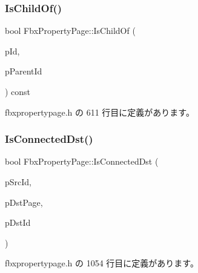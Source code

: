 \subsubsection{\texorpdfstring{Is\+Child\+Of()}{IsChildOf()}}
{\footnotesize\ttfamily bool Fbx\+Property\+Page\+::\+Is\+Child\+Of (\begin{DoxyParamCaption}\item[{\hyperlink{fbxtypes_8h_a088fa96de3b0b3ea69f0f6afef525dfb}{Fbx\+Int}}]{p\+Id,  }\item[{\hyperlink{fbxtypes_8h_a088fa96de3b0b3ea69f0f6afef525dfb}{Fbx\+Int}}]{p\+Parent\+Id }\end{DoxyParamCaption}) const\hspace{0.3cm}{\ttfamily [inline]}}



 fbxpropertypage.\+h の 611 行目に定義があります。

\mbox{\label{class_fbx_property_page_ac637ff1244d34adf55fe0cc16eab4085}} 
\subsubsection{\texorpdfstring{Is\+Connected\+Dst()}{IsConnectedDst()}}
{\footnotesize\ttfamily bool Fbx\+Property\+Page\+::\+Is\+Connected\+Dst (\begin{DoxyParamCaption}\item[{\hyperlink{fbxtypes_8h_a088fa96de3b0b3ea69f0f6afef525dfb}{Fbx\+Int}}]{p\+Src\+Id,  }\item[{\hyperlink{class_fbx_property_page}{Fbx\+Property\+Page} $\ast$}]{p\+Dst\+Page,  }\item[{\hyperlink{fbxtypes_8h_a088fa96de3b0b3ea69f0f6afef525dfb}{Fbx\+Int}}]{p\+Dst\+Id }\end{DoxyParamCaption})\hspace{0.3cm}{\ttfamily [inline]}}



 fbxpropertypage.\+h の 1054 行目に定義があります。

\mbox{\label{class_fbx_property_page_a4760ecbd7175b14dfcd21c1e379b2d2c}} 
